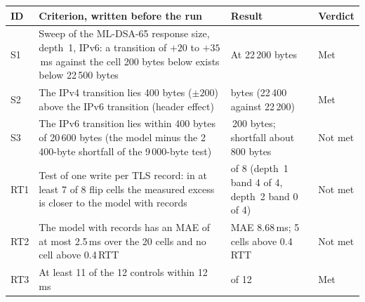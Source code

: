 \documentclass[preprint,12pt]{elsarticle}
\newcommand{\ms}{\,ms\xspace}
\begin{document}
\begin{center}\begin{minipage}{\textwidth}\footnotesize\captionsetup{justification=raggedright,singlelinecheck=off}
\label{tab:prereg_sweep}
\renewcommand{\arraystretch}{1.12}
\begin{tabularx}{\textwidth}{@{}>{\raggedright\arraybackslash}p{}>{\raggedright\arraybackslash}X>{\raggedright\arraybackslash}X>{\raggedright\arraybackslash}p{}@{}}
\toprule
ID & Criterion, written before the run & Result & Verdict \\
\midrule
S1 & Sweep of the ML-DSA-65 response size, depth~1, IPv6: a transition of $+20$ to $+35$\ms against the cell 200 bytes below exists below 22\,500 bytes & At 22\,200 bytes & Met \\
S2 & The IPv4 transition lies 400 bytes ($\pm200$) above the IPv6 transition (header effect) & 200 bytes (22\,400 against 22\,200) & Met \\
S3 & The IPv6 transition lies within 400 bytes of 20\,600 bytes (the model minus the 2\,400-byte shortfall of the 9\,000-byte test) & 22\,200 bytes; shortfall about 800 bytes & Not met \\
RT1 & Test of one write per TLS record: in at least 7 of 8 flip cells the measured excess is closer to the model with records & 4 of 8 (depth~1 band 4 of 4, depth~2 band 0 of 4) & Not met \\
RT2 & The model with records has an MAE of at most 2.5\ms over the 20 cells and no cell above 0.4\,RTT & MAE 8.68\ms; 5 cells above 0.4\,RTT & Not met \\
RT3 & At least 11 of the 12 controls within 12\ms & 11 of 12 & Met \\
\bottomrule
\end{tabularx}
\end{minipage}\end{center}


\FloatBarrier
\end{document}
